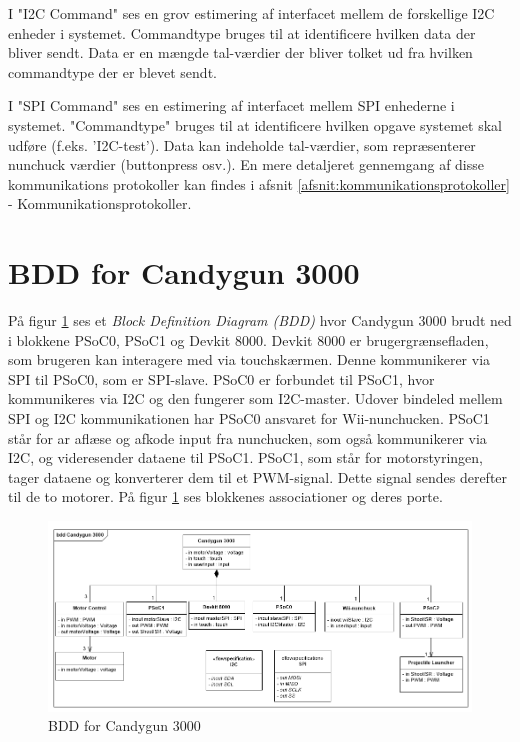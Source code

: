 I "I2C Command" ses en grov estimering af interfacet mellem de forskellige I2C enheder i systemet. Commandtype bruges til at identificere hvilken data der bliver sendt. Data er en mængde tal-værdier der bliver tolket ud fra hvilken commandtype der er blevet sendt.

I "SPI Command" ses en estimering af interfacet mellem SPI enhederne i systemet. "Commandtype" bruges til at identificere hvilken opgave systemet skal udføre (f.eks. 'I2C-test'). Data kan indeholde tal-værdier, som repræsenterer nunchuck værdier (buttonpress osv.). 
En mere detaljeret gennemgang af disse kommunikations protokoller kan findes i afsnit \ref{afsnit:kommunikationsprotokoller} - Kommunikationsprotokoller.

\section{BDD for Candygun 3000}
På figur \ref{fig:BDD} ses et \textit{Block Definition Diagram (BDD)} hvor Candygun 3000 brudt ned i blokkene PSoC0, PSoC1 og Devkit 8000. Devkit 8000 er brugergrænsefladen, som brugeren kan interagere med via touchskærmen. Denne kommunikerer via SPI til PSoC0, som er SPI-slave. PSoC0 er forbundet til PSoC1, hvor kommunikeres via I2C og den fungerer som I2C-master. Udover bindeled mellem SPI og I2C kommunikationen har  PSoC0 ansvaret for Wii-nunchucken. PSoC1 står for ar aflæse og afkode input fra nunchucken, som også kommunikerer via I2C, og videresender dataene til PSoC1. PSoC1, som står for motorstyringen, tager dataene og konverterer dem til et PWM-signal. Dette signal sendes derefter til de to motorer. På figur \ref{fig:BDD} ses blokkenes associationer og deres porte.  

\begin{figure}[H]
	\centering
	\includegraphics[width= \textwidth]{Systemarkitektur/images/BDD_overordnet.png}
	\caption{BDD for Candygun 3000}
	\label{fig:BDD}
\end{figure}


